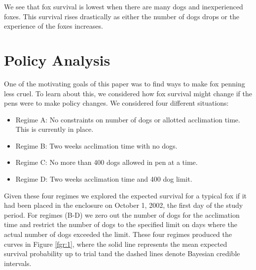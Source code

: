 \documentclass[aoas,preprint]{imsart}
\numberwithin{equation}{section}
\theoremstyle{plain}
\begin{document}
We see that fox survival is lowest when there are many dogs and inexperienced foxes. This survival rises drastically as either the number of dogs drops or the experience of the foxes increases.

\section{Policy Analysis}
One of the motivating goals of this paper was to find ways to make fox penning less cruel. To learn about this, we considered how fox survival might change if the pens were to make policy changes. We considered four different situations:
	\begin{itemize}
		\item Regime A: No constraints on number of dogs or allotted acclimation time. This is currently in place.
		\item Regime B: Two weeks acclimation time with no dogs.
		\item Regime C: No more than 400 dogs allowed in pen at a time.
		\item Regime D: Two weeks acclimation time and 400 dog limit.
	\end{itemize}
Given these four regimes we explored the expected survival for a typical fox if it had been placed in the enclosure on October 1, 2002, the first day of the study period. For regimes (B-D) we zero out the number of dogs for the acclimation time and restrict the number of dogs to the specified limit on days where the actual number of dogs exceeded the limit.
These four regimes produced the curves in Figure \ref{fgr:1}, where the solid line represents the mean expected survival probability up to trial tand the dashed lines denote Bayesian credible intervals.
\end{document}
